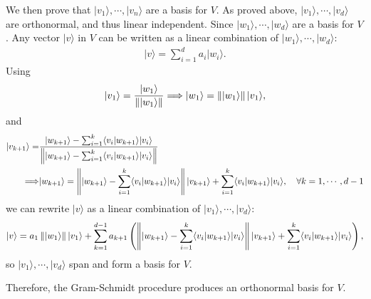 \documentclass[en]{sol-man}
\begin{document}
\begin{pf}
    We then prove that $\lvert v_1\rangle,\cdots,\lvert v_n\rangle$ are a basis for $V$.
    As proved above, $\lvert v_1\rangle,\cdots,\lvert v_d\rangle$ are orthonormal, and thus linear independent. Since $\lvert w_1\rangle,\cdots,\lvert w_d\rangle$ are a basis for $V$. Any vector $\lvert v\rangle$ in $V$ can be written as a linear combination of $\lvert w_1\rangle,\cdots,\lvert w_d\rangle$:
    \begin{align}
        \lvert v\rangle=\sum_{i=1}^da_i\lvert w_i\rangle.
    \end{align}
    Using
    \begin{align}
        \lvert v_1\rangle=\frac{\lvert w_1\rangle}{\left\lVert\lvert w_1\rangle\right\rVert}\Longrightarrow \lvert w_1\rangle=\left\lVert\lvert w_1\rangle\right\rVert\lvert v_1\rangle,\\
    \end{align}
    and
    \begin{align}
        \notag\lvert v_{k+1}\rangle=&\frac{\lvert w_{k+1}\rangle-\sum_{i=1}^k\langle v_i\vert w_{k+1}\rangle\lvert v_i\rangle}{\left\lVert\lvert w_{k+1}\rangle-\sum_{i=1}^k\langle v_i\vert w_{k+1}\rangle\lvert v_i\rangle\right\rVert}\\
        \Longrightarrow&\lvert w_{k+1}\rangle=\left\lVert\lvert w_{k+1}\rangle-\sum_{i=1}^k\langle v_i\vert w_{k+1}\rangle\lvert v_i\rangle\right\rVert\lvert v_{k+1}\rangle+\sum_{i=1}^k\langle v_i\vert w_{k+1}\rangle\lvert v_i\rangle,\quad\forall k=1,\cdots,d-1
    \end{align}
    we can rewrite $\lvert v\rangle$ as a linear combination of $\lvert v_1\rangle,\cdots,\lvert v_d\rangle$:
    \begin{align}
        \lvert v\rangle=a_1\left\lVert\lvert w_1\rangle\right\rVert\lvert v_1\rangle+\sum_{k=1}^{d-1}a_{k+1}\left(\left\lVert\lvert w_{k+1}\rangle-\sum_{i=1}^k\langle v_i\vert w_{k+1}\rangle\lvert v_i\rangle\right\rVert\lvert v_{k+1}\rangle+\sum_{i=1}^k\langle v_i\vert w_{k+1}\rangle\lvert v_i\rangle\right),
    \end{align}
    so $\lvert v_1\rangle,\cdots,\lvert v_d\rangle$ span and form a basis for $V$.

    Therefore, the Gram-Schmidt procedure produces an orthonormal basis for $V$.
\end{pf}
\end{document}
